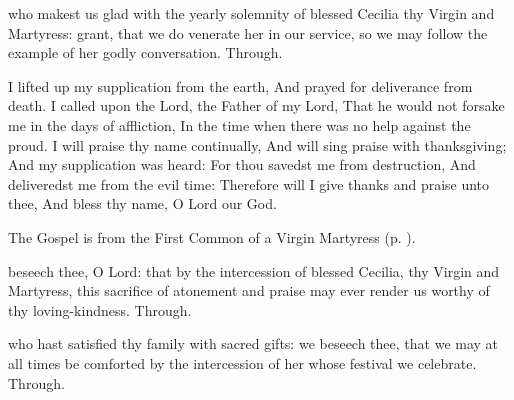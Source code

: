 \collect
{} who makest us glad with the yearly solemnity of blessed Cecilia thy Virgin and Martyress: grant, that we do venerate her in our service, so we may follow the example of her godly conversation. Through.

 I lifted up my supplication from the earth, And prayed for deliverance from death. I called upon the Lord, the Father of my Lord, That he would not forsake me in the days of affliction, In the time when there was no help against the proud. I will praise thy name continually, And will sing praise with thanksgiving; And my supplication was heard: For thou savedst me from destruction, And deliveredst me from the evil time: Therefore will I give thanks and praise unto thee, And bless thy name, O Lord our God.


\begin{rubric}
	The Gospel is from the First Common of a Virgin Martyress (p. \pageref{CommonVirginMartyrIGospel}).
\end{rubric}


\secret
{} beseech thee, O Lord: that by the intercession of blessed Cecilia, thy Virgin and Martyress, this sacrifice of atonement and praise may ever render us worthy of thy loving-kindness. Through.


\postcommunion
{} who hast satisfied thy family with sacred gifts: we beseech thee, that we may at all times be comforted by the intercession of her whose festival we celebrate. Through.


\clearpage
{}


